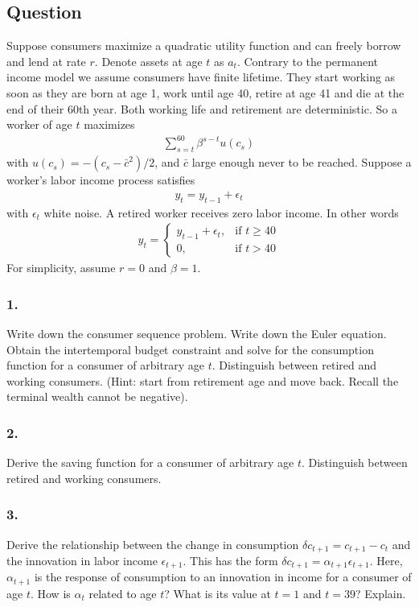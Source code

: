 \documentclass[10pt, a4paper]{article}
\begin{document}
  \subsection*{Question}
    Suppose consumers maximize a quadratic utility function and can freely borrow and lend at rate $r$. Denote assets at age $t$ as $a_t$. Contrary to the permanent income model we assume consumers have finite lifetime. They start working as soon as they are born at age 1, work until age 40, retire at age 41 and die at the end of their 60th year. Both working life and retirement are deterministic. So a worker of age $t$ maximizes
    \begin{gather*}
      \sum\limits_{s=t}^{60}\beta^{s-t}u(c_s)
    \end{gather*}
    with $u(c_s) = -(c_s-\bar{c}^2)/2$, and $\bar{c}$ large enough never to be reached. Suppose a worker's labor income process satisfies
    \begin{gather*}
      y_t = y_{t-1}+\epsilon_t
    \end{gather*}
    with $\epsilon_t$ white noise. A retired worker receives zero labor income. In other words
    \begin{gather*}
      y_t = \begin{cases}
        y_{t-1}+\epsilon_t, & \text{if $t\geq40$} \\
        0, & \text{if $t>40$}
      \end{cases}
    \end{gather*}
    For simplicity, assume $r=0$ and $\beta=1$.
    \subsubsection*{1.}
      Write down the consumer sequence problem. Write down the Euler equation. Obtain the intertemporal budget constraint and solve for the consumption function for a consumer of arbitrary age $t$. Distinguish between retired and working consumers. (Hint: start from retirement age and move back. Recall the terminal wealth cannot be negative).
    \subsubsection*{2.}
      Derive the saving function for a consumer of arbitrary age $t$. Distinguish between retired and working consumers.
    \subsubsection*{3.}
      Derive the relationship between the change in consumption $\delta c_{t+1} = c_{t+1}-c_t$ and the innovation in labor income $\epsilon_{t+1}$. This has the form $\delta c_{t+1} = \alpha_{t+1}\epsilon_{t+1}$. Here, $\alpha_{t+1}$ is the response of consumption to an innovation in income for a consumer of age $t$. How is $\alpha_t$ related to age $t$? What is its value at $t=1$ and $t=39$? Explain.
\end{document}
